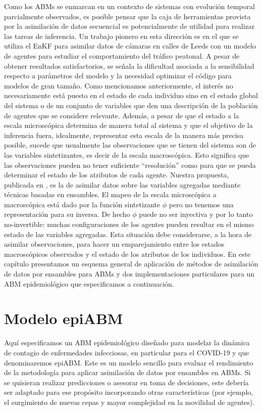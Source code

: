 Como los ABMs se enmarcan en un contexto de sistemas con evolución temporal parcialmente observados, es posible pensar que la caja de herramientas provista por la asimilación de datos secuencial es potencialmente de utilidad para realizar las tareas de inferencia. Un trabajo pionero en esta dirección es \cite{Ward2016} en el que se utiliza el EnKF para asimilar datos de cámaras en calles de Leeds con un modelo de agentes para estudiar el comportamiento del tráfico peatonal. A pesar de obtener resultados satisfactorios, se señala la dificultad asociada a la sensibilidad respecto a parámetros del modelo y la necesidad optimizar el código para modelos de gran tamaño. Como mencionamos anteriormente, el interés no necesariamente está puesto en el estado de cada individuo sino en el estado global del sistema o de un conjunto de variables que den una descripción de la población de agentes que se considere relevante. Además, a pesar de que el estado a la escala microscópica determina de manera total al sistema y que el objetivo de la inferencia fuera, idealmente, representar esta escala de la manera más precisa posible, sucede que usualmente las observaciones que se tienen del sistema son de las variables sintetizantes, es decir de la escala macroscópica. Esto significa que las observaciones pueden no tener suficiente ``resolución'' como para que se pueda determinar el estado de los atributos de cada agente. Nuestra propuesta, publicada en \cite{Cocucci2022}, es la de asimilar datos sobre las variables agregadas mediante técnicas basadas en ensambles. El mapeo de la escala microscópica a macroscópica está dado por la función sintetizante $\phi$ pero no tenemos una representación para su inversa. De hecho $\phi$ puede no ser inyectiva y por lo tanto no-invertible: muchas configuraciones de los agentes pueden resultar en el mismo estado de las variables agregadas. Esta situación debe considerarse, a la hora de asimilar observaciones, para hacer un emparejamiento entre los estados macroscópicos observados y el estado de los atributos de los individuos. En este capítulo presentamos un esquema general de aplicación de métodos de asimilación de datos por ensambles para ABMs y dos implementaciones particulares para un ABM epidemiológico que especificamos a continuación.

\section{Modelo epiABM} \label{sec:epi_abm}

Aquí especificamos un ABM epidemiológico diseñado para modelar la dinámica de contagio de enfermedades infecciosas, en particular para el COVID-19 y que denominaremos epiABM. Este es un modelo sencillo para evaluar el rendimiento de la metodología para aplicar asimilación de datos por ensambles en ABMs. Si se quisieran realizar predicciones o asesorar en toma de decisiones, este debería ser adaptado para ese propósito incorporando otras características (por ejemplo, el surgimiento de nuevas cepas y mayor complejidad en la movilidad de agentes).

